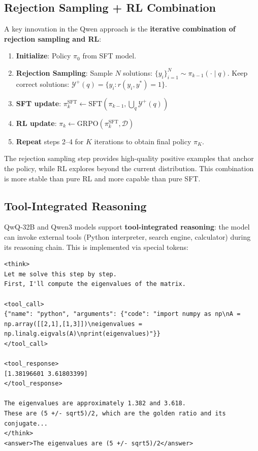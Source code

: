 \subsection{Rejection Sampling + RL Combination}
\label{rejection-sampling-rl-combination}

A key innovation in the Qwen approach is the \textbf{iterative combination of rejection sampling and RL}:

\begin{enumerate}
  \item \textbf{Initialize}: Policy $\pi_0$ from SFT model.
  \item \textbf{Rejection Sampling}: Sample $N$ solutions: $\{y_i\}_{i=1}^N \sim \pi_{k-1}(\cdot \mid q)$. Keep correct solutions: $\mathcal{Y}^+(q) = \{y_i : r(y_i, y^*) = 1\}$.
  \item \textbf{SFT update}: $\pi_k^{\text{SFT}} \leftarrow \text{SFT}(\pi_{k-1}, \bigcup_q \mathcal{Y}^+(q))$
  \item \textbf{RL update}: $\pi_k \leftarrow \text{GRPO}(\pi_k^{\text{SFT}}, \mathcal{D})$
  \item \textbf{Repeat} steps 2--4 for $K$ iterations to obtain final policy $\pi_K$.
\end{enumerate}

The rejection sampling step provides high-quality positive examples that anchor the policy, while RL explores beyond the current distribution. This combination is more stable than pure RL and more capable than pure SFT.

\subsection{Tool-Integrated Reasoning}
\label{tool-integrated-reasoning}

QwQ-32B and Qwen3 models support \textbf{tool-integrated reasoning}: the model can invoke external tools (Python interpreter, search engine, calculator) during its reasoning chain. This is implemented via special tokens:

\begin{lstlisting}[style=pythonstyle, caption={Tool-integrated reasoning format in QwQ}]
<think>
Let me solve this step by step.
First, I'll compute the eigenvalues of the matrix.

<tool_call>
{"name": "python", "arguments": {"code": "import numpy as np\nA = np.array([[2,1],[1,3]])\neigenvalues = np.linalg.eigvals(A)\nprint(eigenvalues)"}}
</tool_call>

<tool_response>
[1.38196601 3.61803399]
</tool_response>

The eigenvalues are approximately 1.382 and 3.618.
These are (5 +/- sqrt5)/2, which are the golden ratio and its conjugate...
</think>
<answer>The eigenvalues are (5 +/- sqrt5)/2</answer>
\end{lstlisting}

